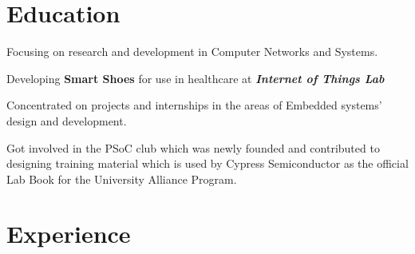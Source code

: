 \documentclass[letterpaper]{deedy-resume} %
\begin{document}
\begin{minipage}[t]{0.74\textwidth} %


\section{Education}

\vspace{\topsep} %
\begin{tightitemize}
\item Focusing on research and development in Computer Networks and Systems.
\item Developing \textbf{Smart Shoes} for use in healthcare at \textbf{\textit{Internet of Things Lab}}
\end{tightitemize}

\sectionspace %

\begin{tightitemize}
\item Concentrated on projects and internships in the areas of Embedded systems' design and development.
\item Got involved in the PSoC club which was newly founded and contributed to designing training material which is used by Cypress Semiconductor as the official Lab Book for the University Alliance Program.
\end{tightitemize}

\sectionspace %



\section{Experience}



\end{minipage}
\end{document}
